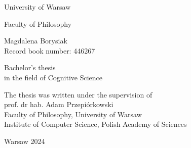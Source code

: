 \begin{titlepage}
	\begin{center}
		\vspace*{1.5cm}
		
		{\huge University of Warsaw}
		
		\vspace{0.1cm}
		{\Large Faculty of Philosophy}
		
		\vspace{3.5cm}
		
		{\Large Magdalena Borysiak} \\ Record book number: 446267
		
		\vspace{2cm}
		
		
		
		\vspace{3cm}
		
		{\large Bachelor's thesis \\ in the field of Cognitive Science}
	\end{center}
	
	\vspace{2.5cm}
	
	\begin{flushright}
		The thesis was written under the supervision of \\
		prof. dr hab. Adam Przepiórkowski \\
		Faculty of Philosophy, University of Warsaw \\
		Institute of Computer Science, Polish Academy of Sciences	
	\end{flushright}
	
	\vspace{2.5cm}
	
	\begin{center}
		Warsaw 2024 %
	\end{center}	
\end{titlepage}